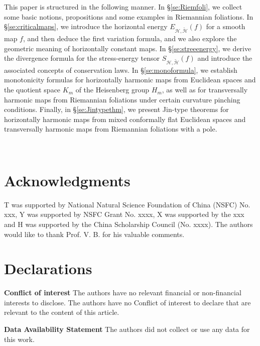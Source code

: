 \documentclass[12pt,reqno]{amsart}
\theoremstyle{definition}
\def\HH{{\mathcal{H},\widetilde{\mathcal{H}}}}
\begin{document}
This paper is structured in the following manner. 
In \S \ref{se:Riemfoli}, we collect some basic notions, propositions and some examples in Riemannian foliations. 
In \S \ref{se:criticalmaps}, we introduce the horizontal energy $E_{\mathcal{H}, \widetilde{\mathcal{H}}}(f)$ for a smooth map $f$, and then deduce the first variation formula, and we also explore the geometric meaning of horizontally constant maps.
In \S \ref{se:streeenergy}, we derive the divergence formula for the stress-energy tensor $S_{\HH}(f)$ and introduce the associated concepts of conservation laws.   
In \S \ref{se:monoformula}, 
we establish monotonicity formulas for horizontally harmonic maps from Euclidean spaces and the quotient space $K_m$ of the Heisenberg group $H_m$, as well as for transversally harmonic maps from Riemannian foliations under certain curvature pinching conditions.
 Finally, in \S \ref{se:Jintypethm}, we present Jin-type theorems for horizontally harmonic maps from mixed conformally flat Euclidean spaces and transversally harmonic maps from  Riemannian foliations with a pole.




~
\section*{Acknowledgments}
T was supported by National Natural Science Foundation of China (NSFC) No. xxx, 
Y was supported by NSFC Grant No. xxxx,
X was supported by the xxx  
and H was supported by the China Scholarship Council (No. xxxx).
The authors would like to thank Prof. V. B. for his valuable comments.

\section*{Declarations}

\textbf{Conflict of interest} The authors have no relevant financial or non-financial interests to disclose. The authors
have no Conflict of interest to declare that are relevant to the content of this article.

\textbf{Data Availability Statement} The authors did not collect
or use any data for this work.


   
\end{document}
